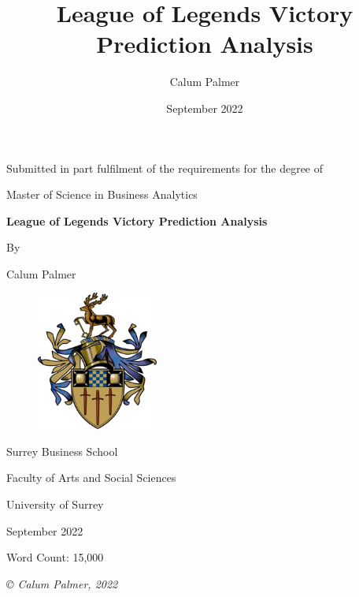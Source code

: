 \documentclass[12pt,a4 paper]{report}
\title{League of Legends Victory Prediction Analysis}
\author{Calum Palmer}
\date{September 2022}
\begin{document}
    \begin{titlepage}
    \centering
        {\large Submitted in part fulfilment of the requirements for the degree of}


        {\Large Master of Science in Business Analytics}

    \vspace{1.5cm}
        {\huge\bfseries League of Legends Victory Prediction Analysis}

    \vspace{1cm}
        {By}

    \vspace{0.5cm}
        {\Large Calum Palmer}

    \vspace{0.25cm}
    \begin{figure}[h]
        \centering
        \includegraphics[width=4cm]{figures/SurreyCrest}
    \end{figure}

    \vspace{0.25cm}
        {\large Surrey Business School}

    \vspace{0.25cm}
        {\large Faculty of Arts and Social Sciences}

    \vspace{0.25cm}
        {\large University of Surrey}

    \vspace{1cm}
        {\large September 2022}

    \vspace{1cm}
        {\large Word Count: 15,000}

    \vfill
        {\itshape © Calum Palmer, 2022}

    \end{titlepage}

    \setcounter{page}{2}
\end{document}
